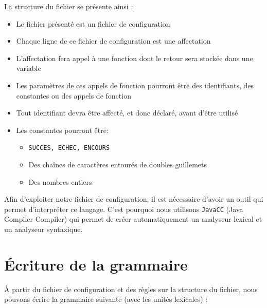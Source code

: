 \documentclass[a4paper, 12pt]{report}
\begin{document}
La structure du fichier se présente ainsi :
\begin{itemize}
	\item Le fichier présenté est un fichier de configuration
	\item Chaque ligne de ce fichier de configuration est une affectation
	\item L'affectation fera appel à une fonction dont le retour sera stockée dans une variable
	\item Les paramètres de ces appels de fonction pourront être des identifiants, des constantes ou des appels de fonction
	\item Tout identifiant devra être affecté, et donc déclaré, avant d'être utilisé
	\item Les constantes pourront être:
	\begin{itemize}
		\item \texttt{SUCCES, ECHEC, ENCOURS}
		\item Des chaînes de caractères entourés de doubles guillemets
		\item Des nombres entiers
	\end{itemize}
\end{itemize}

Afin d'exploiter notre fichier de configuration, il est nécessaire d'avoir un outil qui permet d'interpréter ce langage.
C'est pourquoi nous utilisons \texttt{JavaCC} (Java Compiler Compiler) qui permet de créer automatiquement un analyseur lexical et un analyseur syntaxique.

\section{Écriture de la grammaire}

À partir du fichier de configuration et des règles sur la structure du fichier, nous pouvons écrire la grammaire suivante (avec les unités lexicales) :
\end{document}
